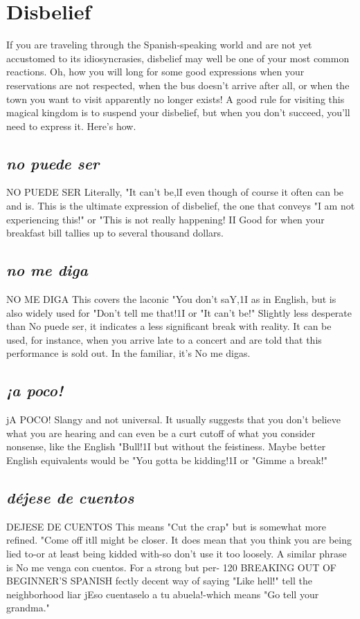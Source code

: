 \section{Disbelief}

If you are traveling through the Spanish-speaking world and
are not yet accustomed to its idiosyncrasies, disbelief may well be one
of your most common reactions. Oh, how you will long for some good
expressions when your reservations are not respected, when the bus
doesn't arrive after all, or when the town you want to visit apparently
no longer exists! A good rule for visiting this magical kingdom is to
suspend your disbelief, but when you don't succeed, you'll need to express it. Here's how.
\subsection{\emph{no puede ser}}
NO PUEDE SER
Literally, "It can't be,lI even though of course it often can be
and is. This is the ultimate expression of disbelief, the one that conveys "I am not experiencing this!" or "This is not really happening! II
Good for when your breakfast bill tallies up to several thousand
dollars.
\subsection{\emph{no me diga}}
NO ME DIGA
This covers the laconic "You don't saY,1I as in English, but is
also widely used for "Don't tell me that!1I or "It can't be!" Slightly less
desperate than No puede ser, it indicates a less significant break with
reality. It can be used, for instance, when you arrive late to a concert
and are told that this performance is sold out. In the familiar, it's No
me digas.
\subsection{\emph{¡a poco!}}
jA POCO!
Slangy and not universal. It usually suggests that you don't believe what you are hearing and can even be a curt cutoff of what you
consider nonsense, like the English "Bull!1I but without the feistiness.
Maybe better English equivalents would be "You gotta be kidding!1I or
"Gimme a break!"
\subsection{\emph{déjese de cuentos}}
DEJESE DE CUENTOS
This means "Cut the crap" but is somewhat more refined.
"Come off itll might be closer. It does mean that you think you are
being lied to-or at least being kidded with-so don't use it too loosely.
A similar phrase is No me venga con cuentos. For a strong but per-
120 BREAKING OUT OF BEGINNER'S SPANISH
fectly decent way of saying "Like hell!" tell the neighborhood liar jEso
cuentaselo a tu abuela!-which means "Go tell your grandma."
